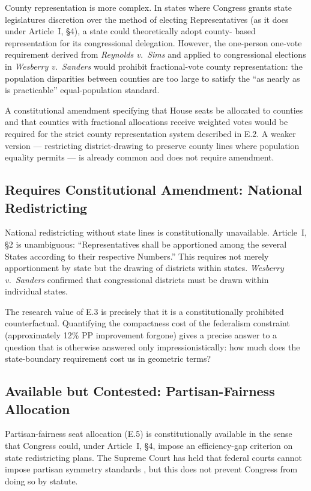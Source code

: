 County representation is more complex.  In states where Congress grants
state legislatures discretion over the method of electing Representatives
(as it does under Article~I, \S4), a state could theoretically adopt county-
based representation for its congressional delegation.  However, the one-person
one-vote requirement derived from \emph{Reynolds v.\ Sims} \citep{reynolds1964}
and applied to congressional elections in \emph{Wesberry v.\ Sanders}
\citep{wesberry1964} would prohibit fractional-vote county representation:
the population disparities between counties are too large to satisfy the
``as nearly as is practicable'' equal-population standard.

A constitutional amendment specifying that House seats be allocated to counties
and that counties with fractional allocations receive weighted votes would be
required for the strict county representation system described in E.2.
A weaker version --- restricting district-drawing to preserve county lines
where population equality permits --- is already common and does not require
amendment.

\subsection{Requires Constitutional Amendment: National Redistricting}

National redistricting without state lines is constitutionally unavailable.
Article~I, \S2 is unambiguous: ``Representatives shall be apportioned among
the several States according to their respective Numbers.''  This requires
not merely apportionment by state but the drawing of districts within states.
\emph{Wesberry v.\ Sanders} \citep{wesberry1964} confirmed that congressional
districts must be drawn within individual states.

The research value of E.3 is precisely that it is a constitutionally prohibited
counterfactual.  Quantifying the compactness cost of the federalism constraint
(approximately 12\% PP improvement forgone) gives a precise answer to a
question that is otherwise answered only impressionistically: how much does
the state-boundary requirement cost us in geometric terms?

\subsection{Available but Contested: Partisan-Fairness Allocation}

Partisan-fairness seat allocation (E.5) is constitutionally available in the
sense that Congress could, under Article~I, \S4, impose an efficiency-gap
criterion on state redistricting plans.  The Supreme Court has held that
federal courts cannot impose partisan symmetry standards \citep{rucho2019},
but this does not prevent Congress from doing so by statute.

